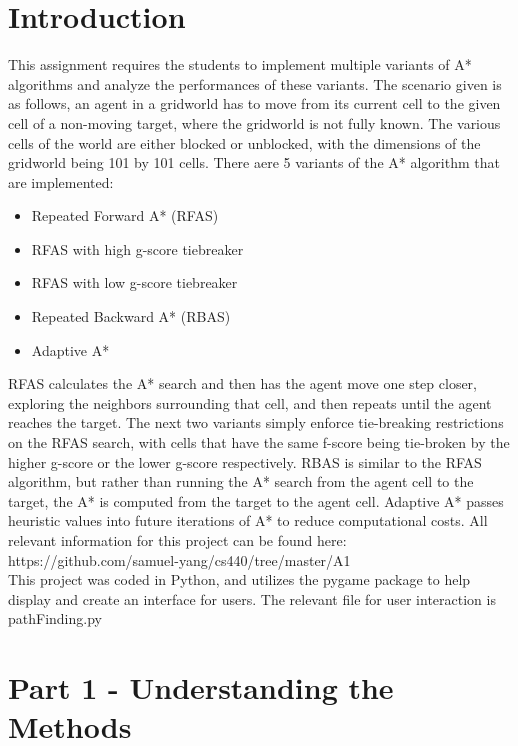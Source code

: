 \documentclass[12pt]{article}
\begin{document}
	\twocolumn
	
	\section*{Introduction}
	
	This assignment requires the students to implement multiple variants of A* algorithms and analyze the performances of these variants.  The scenario given is as follows, an agent in a gridworld has to move from its current cell to the given cell of a non-moving target, where the gridworld is not fully known. The various cells of the world are either blocked or unblocked, with the dimensions of the gridworld being 101 by 101 cells.  There aere 5 variants of the A* algorithm that are implemented:
	\begin{itemize}
		\item Repeated Forward A* (RFAS)
		\item RFAS with high g-score tiebreaker
		\item RFAS with low g-score tiebreaker
		\item Repeated Backward A* (RBAS)
		\item Adaptive A*
	\end{itemize}   
	RFAS calculates the A* search and then has the agent move one step closer, exploring the neighbors surrounding that cell, and then repeats until the agent reaches the target.  The next two variants simply enforce tie-breaking restrictions on the RFAS search, with cells that have the same f-score being tie-broken by the higher g-score or the lower g-score respectively.  RBAS is similar to the RFAS algorithm, but rather than running the A* search from the agent cell to the target, the A* is computed from the target to the agent cell.  Adaptive A* passes heuristic values into future iterations of A* to reduce computational costs.  All relevant information for this project can be found here: \\ https://github.com/samuel-yang/cs440/tree/master/A1 \\
	This project was coded in Python, and utilizes the pygame package to help display and create an interface for users.  The relevant file for user interaction is pathFinding.py
	
	\section*{Part 1 - Understanding the Methods}
	
\end{document}
